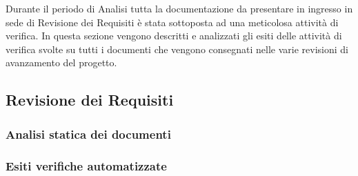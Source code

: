 Durante il periodo di Analisi tutta la documentazione da presentare in ingresso in sede di 
Revisione dei Requisiti è stata sottoposta ad una meticolosa attività di verifica. 
In questa sezione vengono descritti e analizzati gli esiti delle attività di verifica svolte su tutti i documenti che 
vengono consegnati nelle varie revisioni di avanzamento del progetto.

\subsection{Revisione dei Requisiti}
\subsubsection{Analisi statica dei documenti}


\subsubsection{Esiti verifiche automatizzate}
